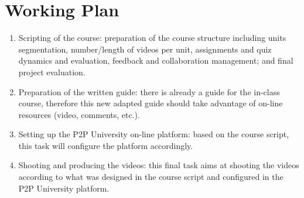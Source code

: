 \documentclass{tufte-book} %
\begin{document}

\chapter{Working Plan}

\begin{enumerate}
	\item Scripting of the course: preparation of the course structure including units segmentation, number/length of videos per unit, assignments and quiz dynamics and evaluation, feedback and collaboration management; and final project evaluation.
	\item Preparation of the written guide: there is already a guide for the in-class course, therefore this new adapted guide should take advantage of on-line resources (video, comments, etc.).
	\item Setting up the P2P University on-line platform: based on the course script, this task will configure the platform accordingly.
	\item Shooting and producing the videos: this final task aims at shooting the videos according to what was designed in the course script and configured in the P2P University platform.
\end{enumerate}


\end{document}
